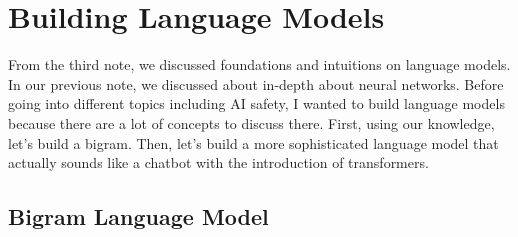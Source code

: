 \documentclass[../../main.tex]{subfiles}
\begin{document}
\chapter{Building Language Models}

From the third note, we discussed foundations and intuitions on
language models. In our previous note, we discussed about in-depth
about neural networks. Before going into different topics including
AI safety, I wanted to build language models because there are
a lot of concepts to discuss there. First, using our knowledge,
let's build a bigram. Then, let's build a more sophisticated
language model that actually sounds like a chatbot with the
introduction of transformers.

\section{Bigram Language Model}
\end{document}
